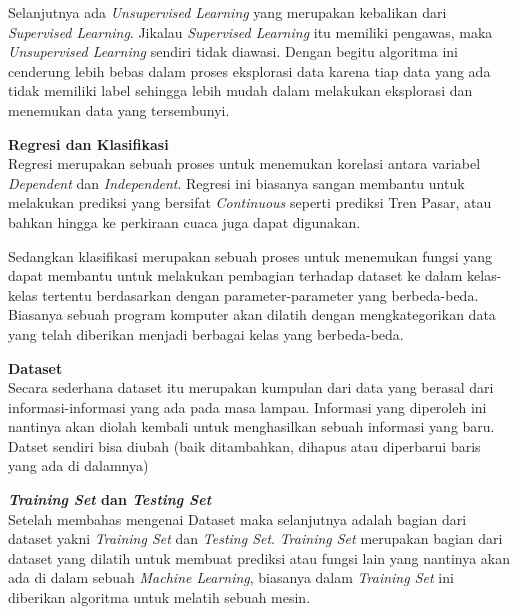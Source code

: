 \documentclass{report}
\begin{document}
\vspace{0.4cm}
\hangindent=0.5cm Selanjutnya ada \emph{Unsupervised Learning} yang merupakan kebalikan dari  \emph{Supervised Learning}. Jikalau \emph{Supervised Learning} itu memiliki pengawas, maka \emph{Unsupervised Learning} sendiri tidak diawasi. Dengan begitu algoritma ini cenderung lebih bebas dalam proses eksplorasi data karena tiap data yang ada tidak memiliki label sehingga lebih mudah dalam melakukan eksplorasi dan menemukan data yang tersembunyi. 

\vspace{0.5cm}

{\bf Regresi dan Klasifikasi}
\vspace{0.1cm}
\\\hangindent=0.5cm Regresi merupakan sebuah proses untuk menemukan korelasi antara variabel \emph{Dependent} dan \emph{Independent}. Regresi ini biasanya sangan membantu untuk melakukan prediksi yang bersifat \emph{Continuous} seperti prediksi Tren Pasar, atau bahkan hingga ke perkiraan cuaca juga dapat digunakan.

\vspace{0.4cm}
\hangindent=0.5cm Sedangkan klasifikasi merupakan sebuah proses untuk menemukan fungsi yang dapat membantu untuk melakukan pembagian terhadap dataset ke dalam kelas-kelas tertentu berdasarkan dengan parameter-parameter yang berbeda-beda. Biasanya sebuah program komputer akan dilatih dengan mengkategorikan data yang telah diberikan menjadi berbagai kelas yang berbeda-beda.

\vspace{0.5cm}

{\bf Dataset}
\vspace{0.1cm}
\\\hangindent=0.5cm Secara sederhana dataset itu merupakan kumpulan dari data yang berasal dari informasi-informasi yang ada pada masa lampau. Informasi yang diperoleh ini nantinya akan diolah kembali untuk menghasilkan sebuah informasi yang baru. Datset sendiri bisa diubah (baik ditambahkan, dihapus atau diperbarui baris yang ada di dalamnya)

\vspace{0.5cm}

{\bf \emph{Training Set} dan \emph{Testing Set} }
\vspace{0.1cm}
\\\hangindent=0.5cm Setelah membahas mengenai Dataset maka selanjutnya adalah bagian dari dataset yakni \emph{Training Set} dan \emph{Testing Set}. \emph{Training Set} merupakan bagian dari dataset yang dilatih untuk membuat prediksi atau fungsi lain yang nantinya akan ada di dalam sebuah \emph{Machine Learning}, biasanya dalam \emph{Training Set} ini diberikan algoritma untuk melatih sebuah mesin.
\end{document}
